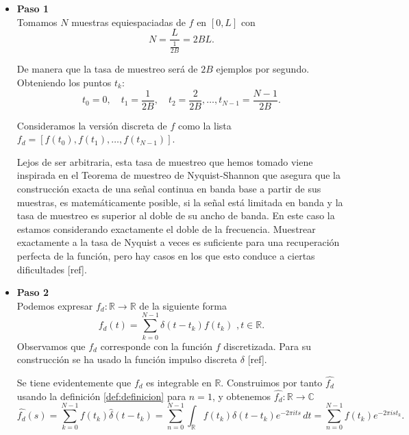 \begin{itemize}
    \item \textbf{Paso 1} \\
    Tomamos $N$ muestras equiespaciadas de $f$  en $[0,L]$ con \[ N = \frac{L}{\frac{1}{2B}} = 2BL. \]

De manera que la tasa de muestreo será de $2B$ ejemplos por segundo. Obteniendo  los puntos $t_k$:
\begin{equation}
   t_0 = 0, \quad t_1 = \frac{1}{2B}, \quad t_2 = \frac{2}{2B}, \ldots, t_{N-1} = \frac{N-1}{2B}. 
\end{equation}

Consideramos la versión discreta de \( f \) como la lista \( f_d = [f(t_0), f(t_1), \ldots, f(t_{N-1})] \). 
\begin{observacion}
 Lejos de ser arbitraria, esta tasa de muestreo que hemos tomado viene inspirada en el Teorema de muestreo de Nyquist-Shannon que asegura que la construcción exacta de una señal continua en banda base a partir de sus muestras, es matemáticamente posible, si la señal está limitada en banda y la tasa de muestreo es superior al doble de su ancho de banda. En este caso la estamos considerando exactamente el doble de la frecuencia. Muestrear exactamente a la tasa de Nyquist a veces es suficiente para una recuperación perfecta de la función, pero hay casos en los que esto conduce a ciertas dificultades [ref].
\end{observacion}


\item \textbf{Paso 2} \\ 
Podemos expresar $f_d : \mathbb{R} \rightarrow \mathbb{R}$ de la siguiente forma
\begin{equation}
    f_d(t) = \sum_{k=0}^{N-1} \delta(t - t_k)  f(t_k) \, \,, t \in \mathbb{R}.
\end{equation} 
Observamos que $f_d$ corresponde con la función $f$ discretizada.  Para su construcción se ha usado la función impulso discreta $\delta$ [ref].

Se tiene evidentemente que $f_d$ es integrable en $\mathbb{R}$. Construimos por tanto $\widehat{f_d}$ usando la definición \ref{def:definicion} para $n=1$, y obtenemos  $\widehat{f_d}: \mathbb{R}  \rightarrow \mathbb{C}$
\begin{equation}\label{eqd}
    \widehat{f_d}(s) = \sum_{k=0}^{N-1} f(t_k)   \widehat{\delta}(t - t_k) = \sum_{n=0}^{N-1} \int_{\mathbb{R}}f(t_k)   \delta(t - t_k)e^{-2 \pi i t s} \, dt = \sum_{n=0}^{N-1} f(t_k)  e^{-2\pi i s t_k}.
\end{equation}


\end{itemize}
